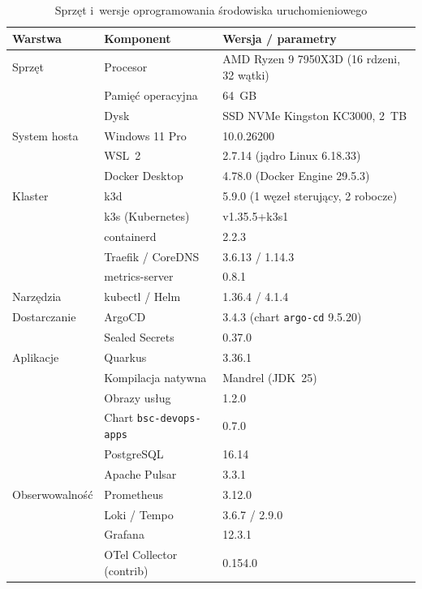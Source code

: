 \begin{table}[H]
  \centering
  \caption{Sprzęt i~wersje oprogramowania środowiska uruchomieniowego}
  \label{tab:runtime-env}
  \small
  \begin{tabular}{lll}
    \hline
    \textbf{Warstwa} & \textbf{Komponent} & \textbf{Wersja / parametry} \\
    \hline
    Sprzęt         & Procesor                    & AMD Ryzen 9 7950X3D (16 rdzeni, 32 wątki) \\
                   & Pamięć operacyjna           & 64~GB \\
                   & Dysk                        & SSD NVMe Kingston KC3000, 2~TB \\
    \hline
    System hosta   & Windows 11 Pro              & 10.0.26200 \\
                   & WSL~2                       & 2.7.14 (jądro Linux 6.18.33) \\
                   & Docker Desktop              & 4.78.0 (Docker Engine 29.5.3) \\
    \hline
    Klaster        & k3d                         & 5.9.0 (1 węzeł sterujący, 2 robocze) \\
                   & k3s (Kubernetes)            & v1.35.5+k3s1 \\
                   & containerd                  & 2.2.3 \\
                   & Traefik / CoreDNS           & 3.6.13 / 1.14.3 \\
                   & metrics-server              & 0.8.1 \\
    \hline
    Narzędzia      & kubectl / Helm              & 1.36.4 / 4.1.4 \\
    \hline
    Dostarczanie   & ArgoCD                      & 3.4.3 (chart \texttt{argo-cd} 9.5.20) \\
                   & Sealed Secrets              & 0.37.0 \\
    \hline
    Aplikacje      & Quarkus                     & 3.36.1 \\
                   & Kompilacja natywna          & Mandrel (JDK~25) \\
                   & Obrazy usług                & 1.2.0 \\
                   & Chart \texttt{bsc-devops-apps} & 0.7.0 \\
                   & PostgreSQL                  & 16.14 \\
                   & Apache Pulsar               & 3.3.1 \\
    \hline
    Obserwowalność & Prometheus                  & 3.12.0 \\
                   & Loki / Tempo                & 3.6.7 / 2.9.0 \\
                   & Grafana                     & 12.3.1 \\
                   & OTel Collector (contrib)    & 0.154.0 \\
    \hline
  \end{tabular}
\end{table}

